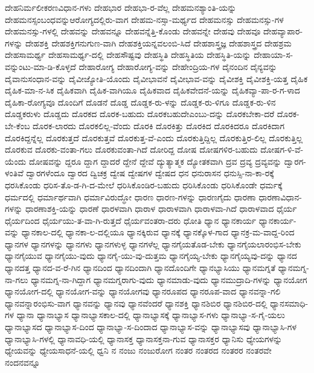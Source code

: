 {ದೇಹನಿರ್ಮಲೀಕರಣವಿಧಾನ-ಗಳು
ದೇಹಭಾರ
ದೇಹಭಾ-ರ-ವೆಲ್ಲ
ದೇಹಮನಶ್ಯಾಂತಿ-ಯನ್ನು
ದೇಹಮನಸ್ಸಂಬಂಧವನ್ನುಆರೋಗ್ಯದಲ್ಲಿರು-ವಾಗ
ದೇಹಮ-ನಸ್ಸಾ-ಮರ್ಥ್ಯದ
ದೇಹಮನಸ್ಸು
ದೇಹಮನಸ್ಸು-ಗಳ
ದೇಹಮನಸ್ಸು-ಗಳಲ್ಲಿ
ದೇಹವನ್ನು
ದೇಹವನ್ನೂ
ದೇಹವನ್ನೆತ್ತಿ-ಕೊಂಡು
ದೇಹವನ್ನೇ
ದೇಹವು
ದೇಹವೂ
ದೇಹವ್ಯಾಪಾರ-ಗಳನ್ನು
ದೇಹಶಕ್ತಿ
ದೇಹಶಕ್ತಿಗನುಗುಣ-ವಾಗಿ
ದೇಹಶಕ್ತಿಯನ್ನವಲಂಬಿ-ಸಿದೆ
ದೇಹಶಾಸ್ತ್ರಜ್ಞ
ದೇಹಶಾಸ್ತ್ರದ
ದೇಹಶ್ರಮ
ದೇಹಸಾಮರ್ಥ್ಯ
ದೇಹಸಾಮರ್ಥ್ಯ-ದಲ್ಲಿ
ದೇಹಸೌಷ್ಟವು
ದೇಹಸ್ಥಿತಿ
ದೇಹಸ್ಥಿತಿಯ
ದೇಹಸ್ಥಿತಿ-ಯನ್ನು
ದೇಹಾಯಾ-ಸ-ವನ್ನುಂಟು-ಮಾ-ಡಿ-ಕೊಳ್ಳದೆ
ದೇಹಾರೋಗ್ಯ
ದೇಹಾರೋಗ್ಯ-ವನ್ನು
ದೇಹೇಂದ್ರಿಯ-ಗಳ
ದೈನಂದಿನ
ದೈನ್ಯವನ್ನು
ದೈವಾನುಸಂಧಾನ-ವನ್ನು
ದೈವೀಜ್ಯೋತಿ-ಯೊಂದು
ದೈವೀಭಾವನೆ
ದೈವೀಭಾವ-ವನ್ನು
ದೈವೀಶಕ್ತಿ
ದೈವೀಶಕ್ತಿ-ಯತ್ತ
ದೈಹಿಕ
ದೈಹಿಕ-ಮಾ-ನ-ಸಿಕ
ದೈಹಿಕವಾಗಿ
ದೈಹಿಕ-ವಾಗಿಯೂ
ದೈಹಿಕವಾದ
ದೈಹಿಕವೇದನೆ-ಯನ್ನು
ದೈಹಿಕವ್ಯಾ-ಪಾ-ರ-ಗ-ಳಾದ
ದೈಹಿಕಾ-ರೋಗ್ಯವೂ
ದೊಂದಿಗೆ
ದೊಡನೆ
ದೊಡ್ಡ
ದೊಡ್ಡಕ-ರು-ಳನ್ನು
ದೊಡ್ಡಕ-ರು-ಳಿಗೂ
ದೊಡ್ಡಕ-ರು-ಳಿನ
ದೊಡ್ಡಕರುಳು
ದೊಡ್ಡದು
ದೊರಕದ
ದೊರಕ-ಬಹುದು
ದೊರಕಬಹುದೇಎಂಬು-ದನ್ನು
ದೊರಕಬೇಕಾ-ದರೆ
ದೊರಕ-ಬೇ-ಕೆಂಬ
ದೊರಕ-ಲಾರದು
ದೊರಕಲಿಲ್ಲ-ವೆಂದು
ದೊರಕಿ
ದೊರಕಿತ್ತು
ದೊರಕಿದ
ದೊರಕಿದರೂ
ದೊರಕಿದಾಗ
ದೊರಕಿದ್ದನ್ನೆಲ್ಲ
ದೊರಕುತ್ತದೆ
ದೊರಕುತ್ತವೆ
ದೊರಕುತ್ತ-ವೆ-ಎಂದು
ದೊರಕುತ್ತಿದ್ದಿಲ್ಲ
ದೊರಕುತ್ತಿರ-ಲಿಲ್ಲ
ದೊರಕುತ್ತಿಲ್ಲ
ದೊರಕುವ
ದೊರಕು-ವಂತಾ-ಗಲು
ದೊರಕುವಂತಾ-ಗಿದೆ
ದೋರಿದ್ದ
ದೋಷ
ದೋಷಗಳಿರ-ಬಹುದು
ದೋಷಗ-ಳಿ-ವೆ-ಯೆಂದು
ದೋಷವನ್ನು
ದ್ದರೂ
ದ್ದಾಗ
ದ್ದಾದರೆ
ದ್ದೇನೆ
ದ್ದೇವೆ
ದ್ಯುತ್ಯಾತ್ಮಕ
ದ್ಯೋತಕವಾಗಿ
ದ್ರವ
ದ್ರವ್ಯ
ದ್ರವ್ಯವನ್ನು
ದ್ವಾರಗ-ಳಂತಿವೆ
ದ್ವಾರಗಳೆಂದೂ
ದ್ವಾರದ
ದ್ವಿಚಕ್ರ
ದ್ವೇಷ
ದ್ವೇಷಗಳ
ದ್ವೇಷದ
ಧನ
ಧನುರಾಸನ
ಧನುಸ್ಸಿ-ನಾ-ಕಾ-ರಕ್ಕೆ
ಧರಸಿಕೊಂಡು
ಧರಿಸ-ತೊ-ಡ-ಗಿ-ದ-ಮೇಲೆ
ಧರಿಸಿಕೊಂಡಿರ-ಬಹುದು
ಧರಿಸಿಕೊಂಡು
ಧರಿಸಿಕೊಂಡೇ
ಧರ್ಮಕ್ಕೆ
ಧರ್ಮದಲ್ಲಿ
ಧರ್ಮಾರ್ಥವಾಗಿ
ಧರ್ಮಾವಿರುದ್ಧೋ
ಧಾರಣ
ಧಾರಣ-ಗಳನ್ನು
ಧಾರಣಗೈದು
ಧಾರಣಾ
ಧಾರಣಾವಿಧಾನ-ಗಳನ್ನು
ಧಾರಣಾಶಕ್ತಿ-ಯನ್ನು
ಧಾರಣೆ
ಧಾರಳವಾಗಿ
ಧಾರಾಳ
ಧಾರಾಳವಾಗಿ
ಧಾರಾಳವಾ-ಗಿದೆ
ಧಾರಾಳವಾದ
ಧೈರ್ಯ
ಧೈರ್ಯದಿಂದ
ಧೈರ್ಯಯು-ತ-ವಾ-ಗಿ-ರುತ್ತದೆ
ಧೈರ್ಯವಂತರಾ-ದರು
ಧೋತಿ
ಧ್ಯಾನ
ಧ್ಯಾನಕಾರ್ಯ
ಧ್ಯಾನಕಾರ್ಯ-ವನ್ನು
ಧ್ಯಾನಕಾಲ-ದಲ್ಲಿ
ಧ್ಯಾನಕಾ-ಲ-ದಲ್ಲಿಯೂ
ಧ್ಯಾನಕ್ಕಿರುವ
ಧ್ಯಾನಕ್ಕೆ
ಧ್ಯಾನಕ್ಕೊಳ-ಗಾದ
ಧ್ಯಾನಕ್ರ-ಮ-ವಾದ್ದ-ರಿಂದ
ಧ್ಯಾನಗಳ
ಧ್ಯಾನಗಳನ್ನು
ಧ್ಯಾನಗಳು
ಧ್ಯಾನಗಳುಳ್ಳ
ಧ್ಯಾನಗಳೆಲ್ಲ
ಧ್ಯಾನಗೈಯತೊಡ-ಬೇಕು
ಧ್ಯಾನಗೈಯಲಾರಂಭಿಸ-ಬೇಕು
ಧ್ಯಾನಗೈಯುವ
ಧ್ಯಾನಗೈಯು-ವುದು
ಧ್ಯಾನಗೈ-ಯು-ವು-ದುತ್ತಮ
ಧ್ಯಾನಗೈಯ್ಯ-ಬೇಕು
ಧ್ಯಾನಗೈಯ್ಯವು-ದನ್ನು
ಧ್ಯಾನದ
ಧ್ಯಾನದತ್ತ
ಧ್ಯಾನದ-ವ-ರೆ-ಗಿನ
ಧ್ಯಾನದಿಂದ
ಧ್ಯಾನದಿಂದಾಗಿ
ಧ್ಯಾನದೊಂದಿಗೇ
ಧ್ಯಾನಭ್ಯಾಸಿಯು
ಧ್ಯಾನಮಗ್ನತೆ
ಧ್ಯಾನಮಗ್ನ-ನಾ-ಗಲು
ಧ್ಯಾನಮಗ್ನ-ನಾ-ಗಿದ್ದಾಗ
ಧ್ಯಾನಮಗ್ನರಾಗು-ವುದು
ಧ್ಯಾನಮಾಡು-ವುದು
ಧ್ಯಾನಮುದ್ರಾದಿ-ಗಳನ್ನು
ಧ್ಯಾನಯೋಗ
ಧ್ಯಾನಯೋಗ-ದಲ್ಲಿ
ಧ್ಯಾನಯೋಗ-ವನ್ನು
ಧ್ಯಾನಯೋಗವು
ಧ್ಯಾನರೂಪದ
ಧ್ಯಾನರೂಪ-ವಾದ
ಧ್ಯಾನವನ್ನಾ-ಗಲಿ
ಧ್ಯಾನವನ್ನಾರಂಭಿಸು-ವಾಗ
ಧ್ಯಾನವನ್ನು
ಧ್ಯಾನವು
ಧ್ಯಾನವೆಂದರೆ
ಧ್ಯಾನಶಕ್ತಿ
ಧ್ಯಾನಶಿಬಿರ
ಧ್ಯಾನಶಿಬಿರ-ದಲ್ಲಿ
ಧ್ಯಾನಸಮಾಧಿ-ಗಳ
ಧ್ಯಾನಾ
ಧ್ಯಾನಾಭ್ಯಾಸ
ಧ್ಯಾನಾಭ್ಯಾಸಕಾಲ-ದಲ್ಲಿ
ಧ್ಯಾನಾಭ್ಯಾಸಕ್ಕೆ
ಧ್ಯಾನಾಭ್ಯಾಸ-ಗಳು
ಧ್ಯಾನಾಭ್ಯಾ-ಸ-ಗೈ-ಯಲು
ಧ್ಯಾನಾಭ್ಯಾಸದ
ಧ್ಯಾನಾಭ್ಯಾಸ-ದಿಂದ
ಧ್ಯಾನಾಭ್ಯಾ-ಸ-ದಿಂದಾದ
ಧ್ಯಾನಾಭ್ಯಾಸ-ವನ್ನು
ಧ್ಯಾನಾಭ್ಯಾಸವು
ಧ್ಯಾನಾಭ್ಯಾಸಿ-ಗಳ
ಧ್ಯಾನಾಭ್ಯಾಸಿ-ಗಳಲ್ಲಿ
ಧ್ಯಾನಾವಧಿ-ಯಲ್ಲಿ
ಧ್ಯಾನಾಸಕ್ತ
ಧ್ಯಾನಾಸಕ್ತನಾ-ಗುವ
ಧ್ಯಾನಾಸಕ್ತರ
ಧ್ಯಾನಿಸು
ಧ್ಯೇಯಗಳನ್ನು
ಧ್ಯೇಯವನ್ನು
ಧ್ಯೇಯಸಾಧನೆ-ಯಲ್ಲಿ
ಧ್ವನಿ
ನ
ನಂಜು
ನಂಜುರೋಗ
ನಂತರ
ನಂತರದ
ನಂತರರ
ನಂತರವೇ
ನಂದನವನ್ನೂ
}
